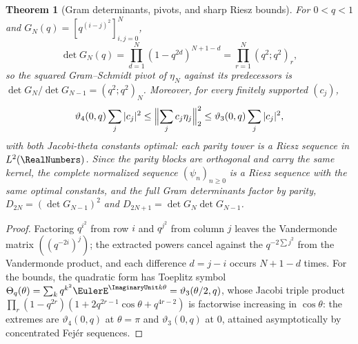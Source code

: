 \documentclass[11pt,oneside]{article}
\numberwithin{equation}{section}
\newtheorem{theorem}{Theorem}[section]
\theoremstyle{definition}
\theoremstyle{remark}
\begin{document}
\begin{theorem}[Gram determinants, pivots, and sharp Riesz bounds]
\label{p6:thm:gram-package}
For $0<q<1$ and $G_N(q)=[q^{(i-j)^2}]_{i,j=0}^N$,
\begin{equation}\label{p6:eq:gram-determinant}
 \boxed{\ \det G_N(q)=\prod_{d=1}^{N}(1-q^{2d})^{N+1-d}
 =\prod_{r=1}^{N}(q^2;q^2)_r,\ }
\end{equation}
so the squared Gram--Schmidt pivot of $\eta_N$ against its predecessors is
$\det G_N/\det G_{N-1}=(q^2;q^2)_N$.  Moreover, for every finitely supported
$(c_j)$,
\begin{equation}\label{p6:eq:riesz-bounds}
 \vartheta_4(0,q)\sum_j|c_j|^2
 \le\Bigl\|\sum_jc_j\eta_j\Bigr\|_2^2
 \le\vartheta_3(0,q)\sum_j|c_j|^2,
\end{equation}
with both Jacobi-theta constants optimal: each parity tower is a Riesz
sequence in $L^2(\RealNumbers)$.  Since the parity blocks are orthogonal and carry the
same kernel, the \emph{complete} normalized sequence $(\psi_n)_{n\ge0}$ is a
Riesz sequence with the same optimal constants, and the full Gram
determinants factor by parity,
$D_{2N}=(\det G_{N-1})^2$ and $D_{2N+1}=\det G_N\det G_{N-1}$.
\end{theorem}

\begin{proof}
Factoring $q^{i^2}$ from row $i$ and $q^{j^2}$ from column $j$ leaves the
Vandermonde matrix $((q^{-2i})^j)$; the extracted powers cancel against the
$q^{-2\sum j^2}$ from the Vandermonde product, and each difference $d=j-i$
occurs $N+1-d$ times.  For the bounds, the quadratic form has Toeplitz symbol
$\Theta_q(\theta)=\sum_kq^{k^2}\EulerE^{\ImaginaryUnit k\theta}=\vartheta_3(\theta/2,q)$,
whose Jacobi triple product
$\prod_r(1-q^{2r})(1+2q^{2r-1}\cos\theta+q^{4r-2})$ is factorwise increasing
in $\cos\theta$: the extremes are $\vartheta_4(0,q)$ at $\theta=\pi$ and
$\vartheta_3(0,q)$ at $0$, attained asymptotically by concentrated Fej\'er
sequences.
\end{proof}
\end{document}
